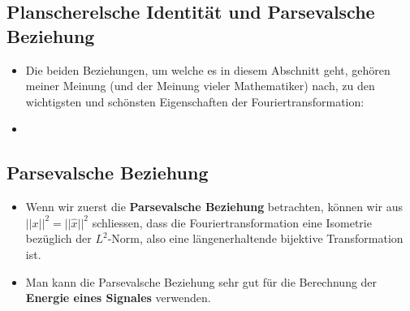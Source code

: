 \documentclass[11pt]{article}
\begin{document}
\subsection*{Planscherelsche Identität und Parsevalsche Beziehung}
\vspace*{-0.5cm}
\begin{itemize}[leftmargin=0pt]
    \item[] Die beiden Beziehungen, um welche es in diesem Abschnitt geht, gehören meiner Meinung (und der Meinung vieler Mathematiker) nach, zu den wichtigsten und schönsten Eigenschaften der Fouriertransformation:
    \item[] 
\end{itemize}
\vspace*{-0.5cm}
\subsection*{Parsevalsche Beziehung}
\vspace*{-0.5cm}
\begin{itemize}[leftmargin=0pt]
    \item[] Wenn wir zuerst die \textbf{Parsevalsche Beziehung} betrachten, können wir aus $||x||^2 = ||\hat{x}||^2$ schliessen, dass die Fouriertransformation eine Isometrie bezüglich der $L^2$-Norm, also eine längenerhaltende bijektive Transformation ist. 
    \item[] Man kann die Parsevalsche Beziehung sehr gut für die Berechnung der \textbf{Energie eines Signales} verwenden.
\end{itemize}
\vspace*{-0.5cm}
\end{document}
